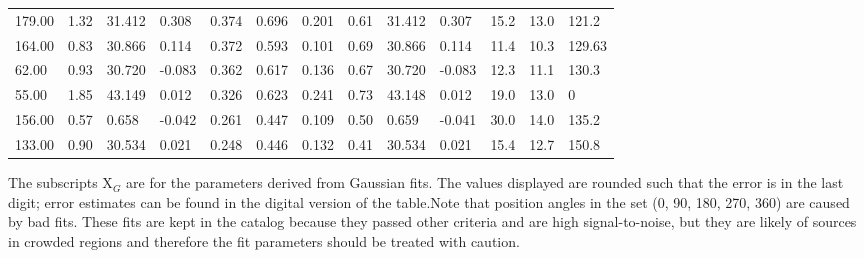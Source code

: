 \begin{table}[htp]
{\begin{tabular}{lllllllllllll}
179.00 & 1.32 & 31.412 & 0.308 & 0.374 & 0.696 & 0.201 & 0.61 & 31.412 & 0.307 & 15.2 & 13.0 & 121.2 \\
164.00 & 0.83 & 30.866 & 0.114 & 0.372 & 0.593 & 0.101 & 0.69 & 30.866 & 0.114 & 11.4 & 10.3 & 129.63 \\
62.00 & 0.93 & 30.720 & -0.083 & 0.362 & 0.617 & 0.136 & 0.67 & 30.720 & -0.083 & 12.3 & 11.1 & 130.3 \\
55.00 & 1.85 & 43.149 & 0.012 & 0.326 & 0.623 & 0.241 & 0.73 & 43.148 & 0.012 & 19.0 & 13.0 & 0 \\
156.00 & 0.57 & 0.658 & -0.042 & 0.261 & 0.447 & 0.109 & 0.50 & 0.659 & -0.041 & 30.0 & 14.0 & 135.2 \\
133.00 & 0.90 & 30.534 & 0.021 & 0.248 & 0.446 & 0.132 & 0.41 & 30.534 & 0.021 & 15.4 & 12.7 & 150.8 \\
\hline
\end{tabular}
}\par
The subscripts X${_G}$ are for the parameters derived from Gaussian fits.  The values displayed are rounded such that the error is in the last digit; error estimates can be found in the digital version of the table.Note that position angles in the set (0, 90, 180, 270, 360) are caused by bad fits.  These fits are kept in the catalog because they passed other criteria and are high signal-to-noise, but they are likely of sources in crowded regions and therefore the fit parameters should be treated with caution.
\end{table}
